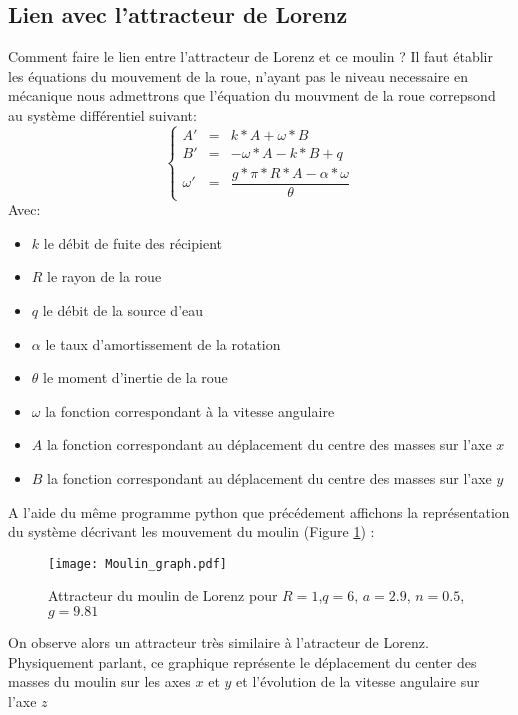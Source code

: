 \subsection{Lien avec l'attracteur de Lorenz}
Comment faire le lien entre l'attracteur de Lorenz et ce moulin ? Il faut établir les équations du mouvement de la roue, n'ayant pas le niveau necessaire en mécanique nous admettrons que l'équation du mouvment de la roue correpsond au système différentiel suivant:
\[
    \left\{
    \begin{array}{rcl}
        A'&=&k*A+\omega*B\\[12pt]
        B'&=&-\omega*A-k*B+q\\[12pt]
        \omega'&=&\dfrac{g*\pi*R*A-\alpha*\omega}{\theta }
    \end{array}
    \right.
\]
Avec: 
\begin{itemize}
    \item $k$ le débit de fuite des récipient
    \item $R$ le rayon de la roue
    \item $q$ le débit de la source d'eau
    \item $\alpha$ le taux d'amortissement de la rotation
    \item $\theta$ le moment d'inertie de la roue
    \item $\omega$ la fonction correspondant à la vitesse angulaire
    \item $A$ la fonction correspondant au déplacement du centre des masses sur l'axe $x$
    \item $B$ la fonction correspondant au déplacement du centre des masses sur l'axe $y$
\end{itemize}

A l'aide du même programme python que précédement affichons la représentation du système décrivant les mouvement du moulin (Figure \ref{fig:moulin_graph}) :

\begin{figure}[!ht]
    \centering
    \texttt{[image: Moulin\_graph.pdf]}
    \caption{\label{fig:moulin_graph}Attracteur du moulin de Lorenz pour $R=1$,$q=6$, $a=2.9$, $n=0.5$, $g=9.81$ } 
\end{figure}

On observe alors un attracteur très similaire à l'atracteur de Lorenz. Physiquement parlant, ce graphique représente le déplacement du center des masses du moulin sur les axes $x$ et $y$ et l'évolution de la vitesse angulaire sur l'axe $z$


